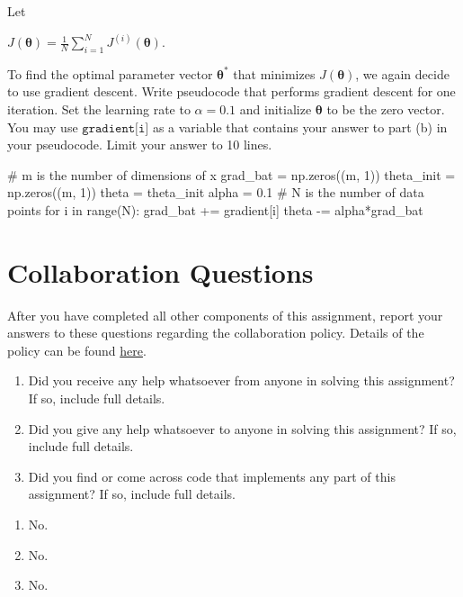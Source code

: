 \documentclass[11pt,addpoints,answers]{exam}
\begin{document}
\begin{questions}
\begin{parts}
\begin{subparts}
        \subpart[2] Let 
        
        \begin{center} $J(\bm\theta) = \frac1N \sum\limits_{i=1}^{N} J^{(i)}(\bm\theta).$ 
        \end{center}
        
        To find the optimal parameter vector $\bm\theta^*$ that minimizes $J(\bm\theta)$, we again decide to use gradient descent. Write pseudocode that performs gradient descent for one iteration. Set the learning rate to $\alpha = 0.1$ and initialize $\bm\theta$ to be the zero vector. You may use $\texttt{gradient[i]}$ as a variable that contains your answer to part (b) in your pseudocode. Limit your answer to 10 lines.

        \begin{your_solution}[title=Your Answer,height=5.5cm,width=15cm]
    
        \begin{your_code_solution}
# m is the number of dimensions of x
grad_bat   = np.zeros((m, 1))
theta_init = np.zeros((m, 1)) 
theta      = theta_init
alpha = 0.1
# N is the number of data points
for i in range(N):
	grad_bat += gradient[i]
theta -= alpha*grad_bat
        \end{your_code_solution}
            
        \end{your_solution}
        
        
    \end{subparts}
    
\end{parts}



\end{questions}

\newpage
\section{Collaboration Questions}
After you have completed all other components of this assignment, report your answers to these questions regarding the collaboration policy. Details of the policy can be found \href{http://www.cs.cmu.edu/~mgormley/courses/10601/syllabus.html}{here}.
\begin{enumerate}
    \item Did you receive any help whatsoever from anyone in solving this assignment? If so, include full details.
    \item Did you give any help whatsoever to anyone in solving this assignment? If so, include full details.
    \item Did you find or come across code that implements any part of this assignment? If so, include full details.
\end{enumerate}

\begin{your_solution}[height=6cm]
\begin{enumerate}
	\item No.
	\item No.
	\item No.
\end{enumerate}
\end{your_solution}
    
\end{document}
